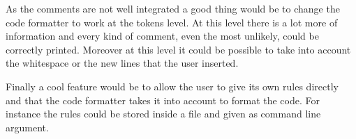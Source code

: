 As the comments are not well integrated a good thing would be to change the code formatter to work at the tokens level. At this level there is a lot more of information and every kind of comment, even the most unlikely, could be correctly printed. Moreover at this level it could be possible to take into account the whitespace or the new lines that the user inserted.

Finally a cool feature would be to allow the user to give its own rules directly and that the code formatter takes it into account to format the code. For instance the rules could be stored inside a file and given as command line argument.
